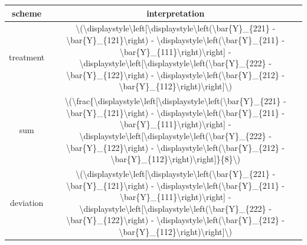 \documentclass[
]{book}
\begin{document}
\begin{table}
\centering
\begin{tabular}{c|c}
\hline
scheme & interpretation\\
\hline
treatment & \textbackslash{}(\textbackslash{}displaystyle\textbackslash{}left[\textbackslash{}displaystyle\textbackslash{}left(\textbackslash{}bar\{Y\}\_\{221\} - \textbackslash{}bar\{Y\}\_\{121\}\textbackslash{}right) - \textbackslash{}displaystyle\textbackslash{}left(\textbackslash{}bar\{Y\}\_\{211\} - \textbackslash{}bar\{Y\}\_\{111\}\textbackslash{}right)\textbackslash{}right] - \textbackslash{}displaystyle\textbackslash{}left[\textbackslash{}displaystyle\textbackslash{}left(\textbackslash{}bar\{Y\}\_\{222\} - \textbackslash{}bar\{Y\}\_\{122\}\textbackslash{}right) - \textbackslash{}displaystyle\textbackslash{}left(\textbackslash{}bar\{Y\}\_\{212\} - \textbackslash{}bar\{Y\}\_\{112\}\textbackslash{}right)\textbackslash{}right]\textbackslash{})\\
\hline
sum & \textbackslash{}(\textbackslash{}frac\{\textbackslash{}displaystyle\textbackslash{}left[\textbackslash{}displaystyle\textbackslash{}left(\textbackslash{}bar\{Y\}\_\{221\} - \textbackslash{}bar\{Y\}\_\{121\}\textbackslash{}right) - \textbackslash{}displaystyle\textbackslash{}left(\textbackslash{}bar\{Y\}\_\{211\} - \textbackslash{}bar\{Y\}\_\{111\}\textbackslash{}right)\textbackslash{}right] - \textbackslash{}displaystyle\textbackslash{}left[\textbackslash{}displaystyle\textbackslash{}left(\textbackslash{}bar\{Y\}\_\{222\} - \textbackslash{}bar\{Y\}\_\{122\}\textbackslash{}right) - \textbackslash{}displaystyle\textbackslash{}left(\textbackslash{}bar\{Y\}\_\{212\} - \textbackslash{}bar\{Y\}\_\{112\}\textbackslash{}right)\textbackslash{}right]\}\{8\}\textbackslash{})\\
\hline
deviation & \textbackslash{}(\textbackslash{}displaystyle\textbackslash{}left[\textbackslash{}displaystyle\textbackslash{}left(\textbackslash{}bar\{Y\}\_\{221\} - \textbackslash{}bar\{Y\}\_\{121\}\textbackslash{}right) - \textbackslash{}displaystyle\textbackslash{}left(\textbackslash{}bar\{Y\}\_\{211\} - \textbackslash{}bar\{Y\}\_\{111\}\textbackslash{}right)\textbackslash{}right] - \textbackslash{}displaystyle\textbackslash{}left[\textbackslash{}displaystyle\textbackslash{}left(\textbackslash{}bar\{Y\}\_\{222\} - \textbackslash{}bar\{Y\}\_\{122\}\textbackslash{}right) - \textbackslash{}displaystyle\textbackslash{}left(\textbackslash{}bar\{Y\}\_\{212\} - \textbackslash{}bar\{Y\}\_\{112\}\textbackslash{}right)\textbackslash{}right]\textbackslash{})\\
\hline
\end{tabular}
\end{table}
\end{document}
